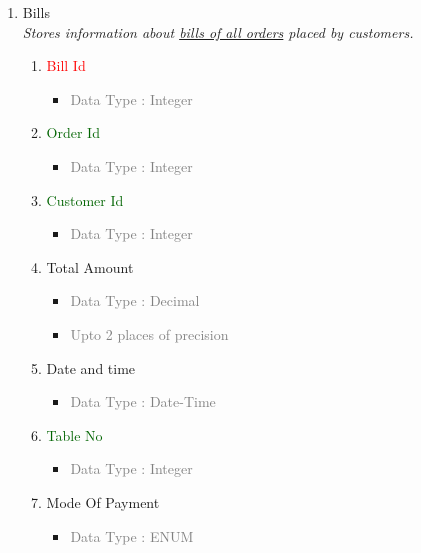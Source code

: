 \begin{enumerate}
        \item Bills \\
        \textit{Stores information about \underline{bills of all orders} placed by customers.}
            \begin{enumerate}[label=\alph*.]
                \item\textcolor{red}{Bill Id}
                    \begin{itemize}[label=-]
                        \item \textcolor{gray}{Data Type : Integer}
                    \end{itemize}
                \item \textcolor{darkgreen}{Order Id}
                    \begin{itemize}[label=-]
                        \item \textcolor{gray}{Data Type : Integer}
                    \end{itemize}
                \item \textcolor{darkgreen}{Customer Id}
                    \begin{itemize}[label=-]
                        \item \textcolor{gray}{Data Type : Integer}
                    \end{itemize}
                \item Total Amount
                    \begin{itemize}[label=-]
                        \item \textcolor{gray}{Data Type : Decimal}
                        \item \textcolor{gray}{Upto 2 places of precision}
                    \end{itemize}
                \item Date and time
                    \begin{itemize}[label=-]
                        \item \textcolor{gray}{Data Type : Date-Time}
                    \end{itemize}
                \item \textcolor{darkgreen}{Table No}
                    \begin{itemize}[label=-]
                        \item \textcolor{gray}{Data Type : Integer}
                    \end{itemize}
                \item Mode Of Payment
                    \begin{itemize}[label=-]
                        \item \textcolor{gray}{Data Type : ENUM}
                    \end{itemize}
            \end{enumerate}
        

\end{enumerate}
